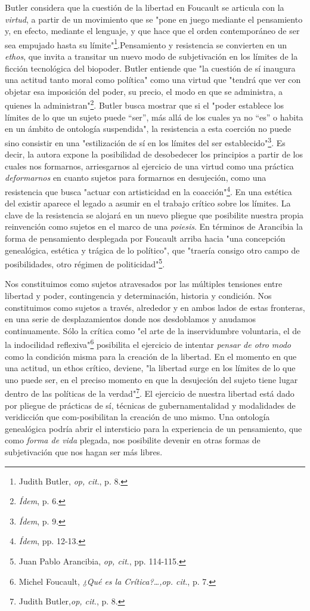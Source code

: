 \documentclass{book}
\begin{document}
Butler considera que la cuestión de la libertad en Foucault se articula
con la \emph{virtud}, a partir de un movimiento que se "pone en juego
mediante el pensamiento y, en efecto, mediante el lenguaje, y que hace
que el orden contemporáneo de ser sea empujado hasta su
límite"\footnote{Judith Butler, \emph{op, cit}., p. 8.}.Pensamiento y
resistencia se convierten en un \emph{ethos}, que invita a transitar un
nuevo modo de subjetivación en los límites de la ficción tecnológica del
biopoder. Butler entiende que "la cuestión de sí inaugura una actitud
tanto moral como política" como una virtud que "tendrá que ver con
objetar esa imposición del poder, su precio, el modo en que se
administra, a quienes la administran"\footnote{\emph{Ídem}, p. 6.}.
Butler busca mostrar que si el "poder establece los límites de lo que un
sujeto puede ``ser'', más allá de los cuales ya no ``es'' o habita en un
ámbito de ontología suspendida", la resistencia a esta coerción no puede
sino consistir en una "estilización de sí en los límites del ser
establecido"\footnote{\emph{Ídem}, p. 9.}. Es decir, la autora expone la
posibilidad de desobedecer los principios a partir de los cuales nos
formarnos, arriesgarnos al ejercicio de una virtud como una práctica
\emph{deformarnos} en cuanto sujetos para formarnos en desujeción, como
una resistencia que busca "actuar con artisticidad en la
coacción"\footnote{\emph{Ídem}, pp. 12-13.}. En una estética del existir
aparece el legado a asumir en el trabajo crítico sobre los límites. La
clave de la resistencia se alojará en un nuevo pliegue que posibilite
nuestra propia reinvención como sujetos en el marco de una
\emph{poiesis}. En términos de Arancibia la forma de pensamiento
desplegada por Foucault arriba hacia "una concepción genealógica,
estética y trágica de lo político", que "traería consigo otro campo de
posibilidades, otro régimen de politicidad"\footnote{Juan Pablo
  Arancibia, \emph{op, cit}., pp. 114-115.}.

Nos constituimos como sujetos atravesados por las múltiples tensiones
entre libertad y poder, contingencia y determinación, historia y
condición. Nos constituimos como sujetos a través, alrededor y en ambos
lados de estas fronteras, en una serie de desplazamientos donde nos
desdoblamos y anudamos continuamente. Sólo la crítica como "el arte de
la inservidumbre voluntaria, el de la indocilidad reflexiva"\footnote{Michel
  Foucault, \emph{¿Qué es la Crítica?\ldots,op. cit}., p. 7.} posibilita
el ejercicio de intentar \emph{pensar de otro modo} como la condición
misma para la creación de la libertad. En el momento en que una actitud,
un ethos crítico, deviene, "la libertad surge en los límites de lo que
uno puede ser, en el preciso momento en que la desujeción del sujeto
tiene lugar dentro de las políticas de la verdad"\footnote{Judith
  Butler,\emph{op, cit}., p. 8.}. El ejercicio de nuestra libertad está
dado por pliegue de prácticas de sí, técnicas de gubernamentalidad y
modalidades de veridicción que com-posibilitan la creación de uno mismo.
Una ontología genealógica podría abrir el intersticio para la
experiencia de un pensamiento, que como \emph{forma de vida} plegada,
nos posibilite devenir en otras formas de subjetivación que nos hagan
ser más libres.
\end{document}
